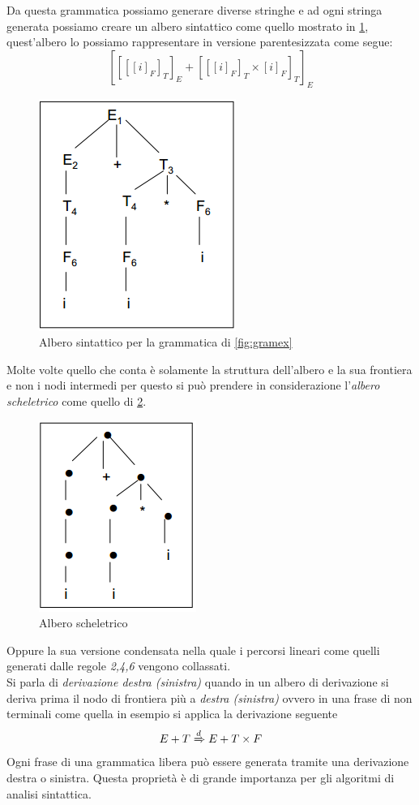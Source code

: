 Da questa grammatica possiamo generare diverse stringhe e ad ogni stringa generata possiamo creare un albero sintattico come quello mostrato in \figurename \ref{fig:sintree}, quest'albero lo possiamo rappresentare in versione parentesizzata come segue:
$$[[[[i]_F]_T]_E+[[[i]_F]_T\times [i]_F]_T]_E$$
\begin{figure}
	\centering
	\includegraphics[width=0.32\linewidth]{img/sintree.png}
	\caption{Albero sintattico per la grammatica di \figurename \ref{fig:gramex}}\label{fig:sintree}
\end{figure}
Molte volte quello che conta è solamente la struttura dell'albero e la sua frontiera e non i nodi intermedi per questo si può prendere in considerazione l'\emph{albero scheletrico} come quello di \figurename \ref{fig:skeletont}. 
\begin{figure}
	\centering
	\includegraphics[width=0.32\linewidth]{img/skeletont.png}
	\caption{Albero scheletrico}\label{fig:skeletont}
\end{figure}
Oppure la sua versione condensata nella quale i percorsi lineari come quelli generati dalle regole \emph{2,4,6} vengono collassati.\\
Si parla di \emph{derivazione destra (sinistra)} quando in un albero di derivazione si deriva prima il nodo di frontiera più a \emph{destra (sinistra)} ovvero in una frase di non terminali come quella in esempio si applica la derivazione seguente
$$E+T\xRightarrow{d}E+T\times F$$
Ogni frase di una grammatica libera può essere generata tramite una derivazione destra o sinistra. Questa proprietà è di grande importanza per gli  algoritmi di analisi sintattica.\\
